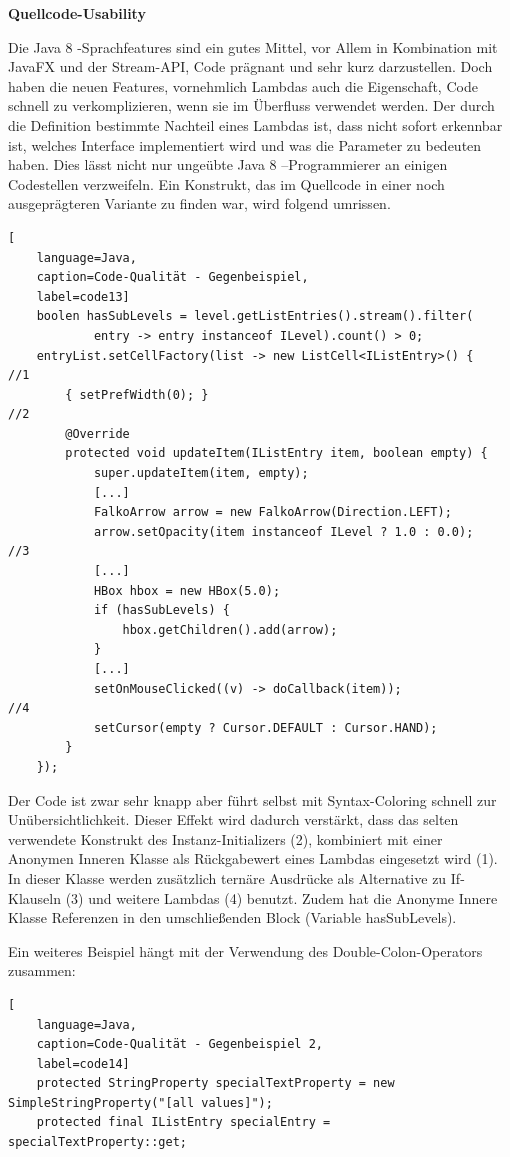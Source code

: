 \textbf{Quellcode-Usability}

Die Java 8 -Sprachfeatures sind ein gutes Mittel, vor Allem in Kombination mit JavaFX und der Stream-API, Code prägnant und sehr kurz darzustellen. Doch haben die neuen Features, vornehmlich Lambdas auch die Eigenschaft, Code schnell zu verkomplizieren, wenn sie im Überfluss verwendet werden. Der durch die Definition bestimmte Nachteil eines Lambdas ist, dass nicht sofort erkennbar ist, welches Interface implementiert wird und was die Parameter zu bedeuten haben. Dies lässt nicht nur ungeübte Java 8 –Programmierer an einigen Codestellen verzweifeln. Ein Konstrukt, das im Quellcode in einer noch ausgeprägteren Variante zu finden war, wird folgend umrissen.

\begin{lstlisting}[
    language=Java,
    caption=Code-Qualität - Gegenbeispiel,
    label=code13]
	boolen hasSubLevels = level.getListEntries().stream().filter(
			entry -> entry instanceof ILevel).count() > 0;
	entryList.setCellFactory(list -> new ListCell<IListEntry>() { 		//1
		{ setPrefWidth(0); } 																//2
		@Override
		protected void updateItem(IListEntry item, boolean empty) {
			super.updateItem(item, empty);
			[...]
			FalkoArrow arrow = new FalkoArrow(Direction.LEFT);
			arrow.setOpacity(item instanceof ILevel ? 1.0 : 0.0); 			//3
			[...]
			HBox hbox = new HBox(5.0);
			if (hasSubLevels) {
				hbox.getChildren().add(arrow);
			}
			[...]
			setOnMouseClicked((v) -> doCallback(item)); 						//4
			setCursor(empty ? Cursor.DEFAULT : Cursor.HAND);
		}
	});
\end{lstlisting}

Der Code ist zwar sehr knapp aber führt selbst mit Syntax-Coloring schnell zur Unübersichtlichkeit. Dieser Effekt wird dadurch verstärkt, dass das selten verwendete Konstrukt des Instanz-Initializers (2), kombiniert mit einer Anonymen Inneren Klasse als Rückgabewert eines Lambdas eingesetzt wird (1). In dieser Klasse werden zusätzlich ternäre Ausdrücke als Alternative zu If-Klauseln (3) und weitere Lambdas (4) benutzt. Zudem hat die Anonyme Innere Klasse Referenzen in den umschließenden Block (Variable hasSubLevels).

Ein weiteres Beispiel hängt mit der Verwendung des Double-Colon-Operators zusammen:

\begin{lstlisting}[
    language=Java,
    caption=Code-Qualität - Gegenbeispiel 2,
    label=code14]
	protected StringProperty specialTextProperty = new SimpleStringProperty("[all values]");
	protected final IListEntry specialEntry = specialTextProperty::get;
\end{lstlisting}

